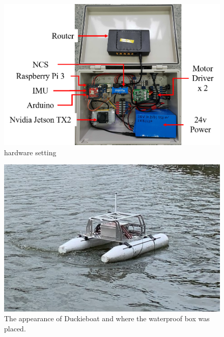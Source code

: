 \begin{figure}[h] %
	\includegraphics[width=0.8\columnwidth]{images/hardware_setting.png}
	\centering
	\caption{hardware setting}
	\label{figure:hardware_setting}
\end{figure}

\begin{figure}[h] %
	\includegraphics[width=0.8\columnwidth]{images/duckieboat.png}
	\centering
	\caption{The appearance of Duckieboat and where the waterproof box was placed.}
	\label{figure:duckieboat}
\end{figure}
